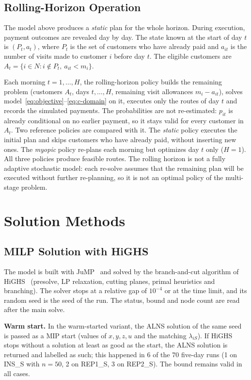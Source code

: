 \documentclass[11pt,a4paper]{article}
\begin{document}
\subsection{Rolling-Horizon Operation}
\label{sec:rolling}
The model above produces a \emph{static} plan for the whole horizon. During
execution, payment outcomes are revealed day by day. The state known at the
start of day $t$ is $(P_t,a_t)$, where $P_t$ is the set of customers who have
already paid and $a_{it}$ is the number of visits made to customer $i$
before day $t$. The eligible customers are
$A_t=\{i\in N: i\notin P_t,\ a_{it}<m_i\}$.

Each morning $t=1,\dots,H$, the rolling-horizon policy builds the remaining
problem (customers $A_t$, days $t,\dots,H$, remaining visit allowances
$m_i-a_{it}$), solves model~\eqref{eq:objective}--\eqref{eq:c-domain} on it,
executes only the routes of day $t$ and records the simulated payments. The
probabilities are not re-estimated: $p_{it}$ is already conditional on no
earlier payment, so it stays valid for every customer in $A_t$. Two
reference policies are compared with it. The \emph{static} policy executes
the initial plan and skips customers who have already paid, without
inserting new ones. The \emph{myopic} policy re-plans each morning but
optimizes day $t$ only ($H=1$). All three policies produce feasible routes.
The rolling horizon is not a fully adaptive stochastic model: each re-solve
assumes that the remaining plan will be executed without further
re-planning, so it is not an optimal policy of the multi-stage problem.

\section{Solution Methods}
\label{sec:methods}

\subsection{MILP Solution with HiGHS}
The model is built with JuMP~\cite{jump2023} and solved by the
branch-and-cut algorithm of HiGHS~\cite{highs2018} (presolve, LP relaxation,
cutting planes, primal heuristics and branching). The solver stops at a
relative gap of $10^{-4}$ or at the time limit, and its random seed is the
seed of the run. The status, bound and node count are read after the main
solve.

\textbf{Warm start.} In the warm-started variant, the ALNS solution of the
same seed is passed as a MIP start (values of $x,y,z,u$ and the matching
$\lambda_{iS}$). If HiGHS stops without a solution at least as good as the
start, the ALNS solution is returned and labelled as such; this happened in
6 of the 70 five-day runs (1 on INS\_S with $n=50$, 2 on REP1\_S, 3 on
REP2\_S). The bound remains valid in all cases.
\end{document}

